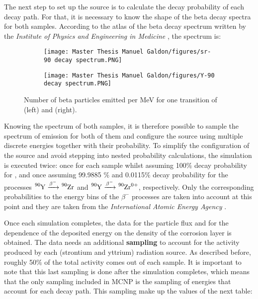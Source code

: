 \label{chapter:sampling of the emission spectra}
The next step to set up the source is to calculate the decay probability of each decay path. For that, it is necessary to know the shape of the beta decay spectra for both samples. According to the atlas of the beta decay spectrum written by the \emph{Institute of Physics and Engineering in Medicine} \cite{BetaRayAtlas}, the spectrum is: 

\begin{figure}[!h]
\hspace{1.6cm}
\begin{subfigure}{0.4\textwidth}
    \texttt{[image: Master Thesis Manuel Galdon/figures/sr-90 decay spectrum.PNG]} 
\end{subfigure}
\hspace{1.6cm}
\begin{subfigure}{0.5\textwidth}
    \texttt{[image: Master Thesis Manuel Galdon/figures/Y-90 decay spectrum.PNG]}
\end{subfigure}
    \caption{Number of beta particles emitted per \unit{\mega\electronvolt} for one transition of  (left) and  (right).}
\label{fig:beta decay spectra of Sr and Y}
\end{figure}

Knowing the spectrum of both samples, it is therefore possible to sample the spectrum of emission for both of them and configure the source using multiple discrete energies together with their probability. To simplify the configuration of the source and avoid stepping into nested probability calculations, the simulation is executed twice: once for each sample whilst assuming 100$\%$ decay probability for , and once assuming 99.9885 $\%$ and 0.0115$\%$ decay probability for the processes $\ce{^{90}{}Y} \xrightarrow{\beta ^-} \ce{^{90}{}Zr}$ and $\ce{^{90}{}Y} \xrightarrow{\beta ^-} \ce{^{90}{}Zr^0+}$, respectively. Only the corresponding probabilities to the energy bins of the $\beta^-$ processes are taken into account at this point and they are taken from the \emph{International Atomic Energy Agency} \cite{intlAtomicEnergy}.

Once each simulation completes, the data for the particle flux and for the dependence of the deposited energy on the density of the corrosion layer is obtained. The data needs an additional \textbf{sampling} to account for the activity produced by each (strontium and yttrium) radiation source. As described before, roughly 50$\%$ of the total activity comes out of each sample. It is important to note that this last sampling is done after the simulation completes, which means that the only sampling included in MCNP is the sampling of energies that account for each decay path. This sampling make up the values of the next table:

